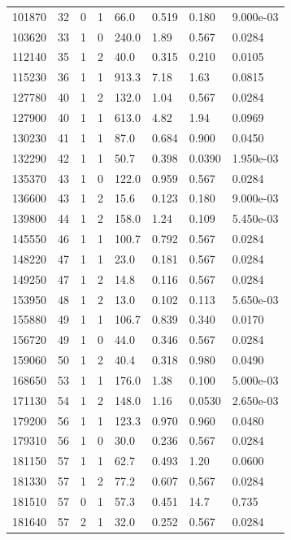 \documentclass[preview]{standalone}
\begin{document}
{{\begin{tabular}{L{1.2cm}C{1.2cm} C{0.3cm}C{0.5cm} C{1.4cm}C{1.4cm} C{1.4cm}C{1.4cm}}
  101870  &    32  & 0     &  1 &  66.0  & 0.519  & 0.180 &  9.000e-03   \\ 
  103620  &    33  & 1     &  0 &  240.0  & 1.89  & 0.567 &  0.0284   \\ 
  112140  &    35  & 1     &  2 &  40.0  & 0.315  & 0.210 &  0.0105   \\ 
  115230  &    36  & 1     &  1 &  913.3  & 7.18  & 1.63 &  0.0815   \\ 
  127780  &    40  & 1     &  2 &  132.0  & 1.04  & 0.567 &  0.0284   \\ 
  127900  &    40  & 1     &  1 &  613.0  & 4.82  & 1.94 &  0.0969   \\ 
  130230  &    41  & 1     &  1 &  87.0  & 0.684  & 0.900 &  0.0450   \\ 
  132290  &    42  & 1     &  1 &  50.7  & 0.398  & 0.0390 &  1.950e-03   \\ 
  135370  &    43  & 1     &  0 &  122.0  & 0.959  & 0.567 &  0.0284   \\ 
  136600  &    43  & 1     &  2 &  15.6  & 0.123  & 0.180 &  9.000e-03   \\ 
  139800  &    44  & 1     &  2 &  158.0  & 1.24  & 0.109 &  5.450e-03   \\ 
  145550  &    46  & 1     &  1 &  100.7  & 0.792  & 0.567 &  0.0284   \\ 
  148220  &    47  & 1     &  1 &  23.0  & 0.181  & 0.567 &  0.0284   \\ 
  149250  &    47  & 1     &  2 &  14.8  & 0.116  & 0.567 &  0.0284   \\ 
  153950  &    48  & 1     &  2 &  13.0  & 0.102  & 0.113 &  5.650e-03   \\ 
  155880  &    49  & 1     &  1 &  106.7  & 0.839  & 0.340 &  0.0170   \\ 
  156720  &    49  & 1     &  0 &  44.0  & 0.346  & 0.567 &  0.0284   \\ 
  159060  &    50  & 1     &  2 &  40.4  & 0.318  & 0.980 &  0.0490   \\ 
  168650  &    53  & 1     &  1 &  176.0  & 1.38  & 0.100 &  5.000e-03   \\ 
  171130  &    54  & 1     &  2 &  148.0  & 1.16  & 0.0530 &  2.650e-03   \\ 
  179200  &    56  & 1     &  1 &  123.3  & 0.970  & 0.960 &  0.0480   \\ 
  179310  &    56  & 1     &  0 &  30.0  & 0.236  & 0.567 &  0.0284   \\ 
  181150  &    57  & 1     &  1 &  62.7  & 0.493  & 1.20 &  0.0600   \\ 
  181330  &    57  & 1     &  2 &  77.2  & 0.607  & 0.567 &  0.0284   \\ 
  181510  &    57  & 0     &  1 &  57.3  & 0.451  & 14.7 &  0.735   \\ 
  181640  &    57  & 2     &  1 &  32.0  & 0.252  & 0.567 &  0.0284   \\ 
\hline 
\end{tabular} 

}}
\end{document}
